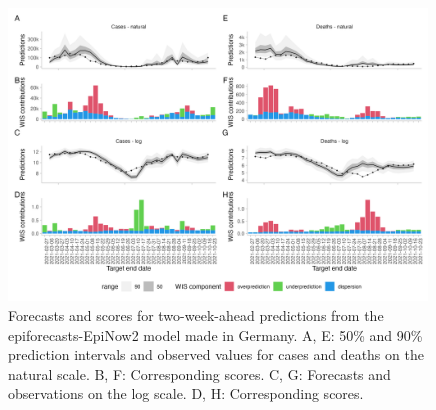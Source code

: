 \documentclass{article}
\begin{document}
\begin{figure}[h!]
    \centering
    \includegraphics[width=0.99\textwidth]{output/figures/HUB-model-comparison-epinow.png}
    \caption{
    Forecasts and scores for two-week-ahead predictions from the epiforecasts-EpiNow2 model made in Germany. A, E: 50\% and 90\% prediction intervals and observed values for cases and deaths on the natural scale. B, F: Corresponding scores. C, G: Forecasts and observations on the log scale. D, H: Corresponding scores. 
    }
    \label{fig:HUB-model-comparison-epinow}
\end{figure}

\clearpage

\end{document}
